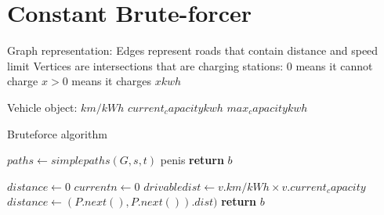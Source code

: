 \section{Constant Brute-forcer}

Graph representation:
Edges represent roads that contain distance and speed limit
Vertices are intersections that are charging stations:
$0$ means it cannot charge
$x > 0$ means it charges $x kwh$

Vehicle object:
$km/kWh$
$current_capacity kwh$
$max_capacity kwh$



\begin{algorithm}
\caption{Bruteforce algorithm}
\begin{algorithmic}[1]
	\State $paths \gets simplepaths(G,s,t)$
	\State penis
	\EndFor
\State \textbf{return} $b$
\EndProcedure
\end{algorithmic}
\end{algorithm}

\begin{algorithm}
\begin{algorithmic}[1]
	\State $distance \gets 0$
	\State $current n \gets 0$
	\State $drivabledist \gets v.km/kWh \times v.current_capacity$
			\State $distance \gets (P.next(), P.next()).dist)$
		\EndFor
	\EndWhile
\State \textbf{return} $b$
\EndProcedure
\end{algorithmic}
\end{algorithm}

















